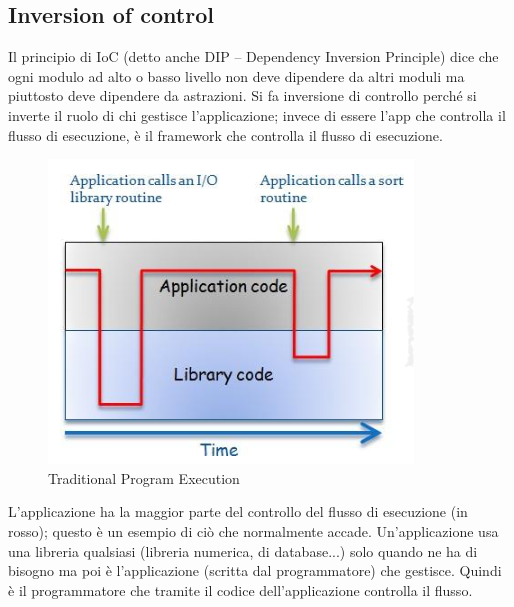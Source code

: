 \subsection{Inversion of control}
Il principio di IoC (detto anche DIP – Dependency Inversion Principle) dice che ogni modulo ad alto o basso livello non deve dipendere da altri moduli ma piuttosto deve dipendere da astrazioni. Si fa inversione di controllo perché si inverte il ruolo di chi gestisce l'applicazione; invece di essere l'app che controlla il flusso di esecuzione, è il framework che controlla il flusso di esecuzione.

\begin{figure}[H]
\centering
\includegraphics[scale=0.8]{images/ioc1}
\caption{Traditional Program Execution\label{fig:UC3}}
\end{figure}
L’applicazione ha la maggior parte del controllo del flusso di esecuzione (in rosso); questo è un esempio di ciò che normalmente accade. Un'applicazione usa una libreria qualsiasi (libreria numerica, di database...) solo quando ne ha di bisogno ma poi è l'applicazione (scritta dal programmatore) che gestisce. Quindi è il programmatore che tramite il codice dell'applicazione controlla il flusso.

